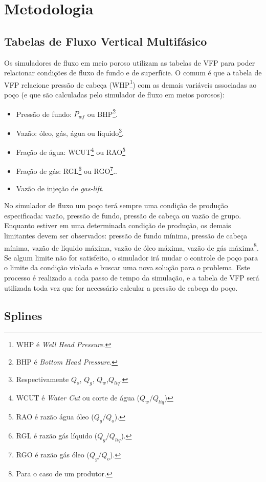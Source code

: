 \documentclass[final,5p]{elsarticle}
\numberwithin{equation}{section}
\begin{document}
\section{Metodologia}

    \subsection{Tabelas de Fluxo Vertical Multifásico}

        Os simuladores de fluxo em meio poroso utilizam as tabelas de VFP para poder relacionar condições de fluxo de fundo e de superfície. O comum é que a tabela de VFP relacione pressão de cabeça (WHP\footnote{WHP é \emph{Well Head Pressure}.}) com as demais variáveis associadas ao poço (e que são calculadas pelo simulador de fluxo em meios porosos): 
        
        \begin{itemize}
            \item Pressão de fundo: $P_{wf}$ ou BHP\footnote{BHP é \emph{Bottom Head Pressure}.}.
            \item Vazão: óleo, gás, água ou líquido\footnote{Respectivamente $Q_o$, $Q_g$, $Q_w$,$Q_{liq}$.}.
            \item Fração de água: WCUT\footnote{WCUT é \emph{Water Cut} ou corte de água ($Q_w/Q_{liq}$)} ou RAO\footnote{RAO é razão água óleo ($Q_g/Q_o$).}
            \item Fração de gás: RGL\footnote{RGL é razão gás líquido ($Q_g/Q_{liq}$).} ou RGO\footnote{RGO é razão gás óleo ($Q_g/Q_o$).}..
            \item Vazão de injeção de \emph{gas-lift}.
        \end{itemize}

        No simulador de fluxo um poço terá sempre uma condição de produção especificada: vazão, pressão de fundo, pressão de cabeça ou vazão de grupo. Enquanto estiver em uma determinada condição de produção, os demais limitantes devem ser observados: pressão de fundo mínima, pressão de cabeça mínima, vazão de líquido máxima, vazão de óleo máxima, vazão de gás máxima\footnote{Para o caso de um produtor.}. Se algum limite não for satisfeito, o simulador irá mudar o controle de poço para o limite da condição violada e buscar uma nova solução para o problema. Este processo é realizado a cada passo de tempo da simulação, e a tabela de VFP será utilizada toda vez que for necessário calcular a pressão de cabeça do poço.

    \subsection{Splines}
    
\end{document}
